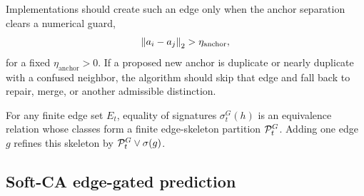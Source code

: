 Implementations should create such an edge only when the anchor separation clears a numerical guard,
\begin{align*}
\left\lVert a_i-a_j\right\rVert_2>\eta_{\mathrm{anchor}},
\end{align*}
for a fixed $\eta_{\mathrm{anchor}}>0$. If a proposed new anchor is duplicate or nearly duplicate with a confused neighbor, the algorithm should skip that edge and fall back to repair, merge, or another admissible distinction.

\begin{theorem}
\label{thm:dgm-graph-partition:informal}
For any finite edge set $E_t$, equality of signatures $\sigma_t^G(h)$ is an equivalence relation whose classes form a finite edge-skeleton partition $\mathcal{P}_t^G$. Adding one edge $g$ refines this skeleton by $\mathcal{P}_t^G\vee\sigma(g)$.
\end{theorem}

\subsection{Soft-CA edge-gated prediction}

